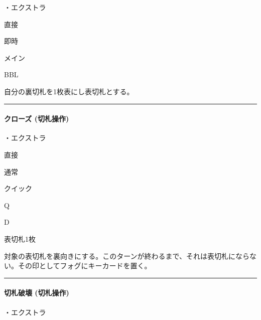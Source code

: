 \documentclass[letterpaper,10pt,dvipdfmx]{sphinxmanual}
\begin{document}
\sphinxAtStartPar
・エクストラ

\sphinxAtStartPar
{} 直接

\sphinxAtStartPar
{} 即時

\sphinxAtStartPar
{} メイン

\sphinxAtStartPar
{} BBL

\sphinxAtStartPar
{}

\sphinxAtStartPar
自分の裏切札を1枚表にし表切札とする。


\bigskip\hrule\bigskip



\paragraph{クローズ (切札操作)}
\label{\detokenize{auto/frameActionlist:act-close}}\label{\detokenize{auto/frameActionlist:id12}}
\sphinxAtStartPar
{}

\sphinxAtStartPar
・エクストラ

\sphinxAtStartPar
{} 直接

\sphinxAtStartPar
{} 通常

\sphinxAtStartPar
{} クイック

\sphinxAtStartPar
{} Q

\sphinxAtStartPar
{} D

\sphinxAtStartPar
{}

\sphinxAtStartPar
表切札1枚

\sphinxAtStartPar
{}

\sphinxAtStartPar
対象の表切札を裏向きにする。このターンが終わるまで、それは表切札にならない。その印としてフォグにキーカードを置く。


\bigskip\hrule\bigskip



\paragraph{切札破壊 (切札操作)}
\label{\detokenize{auto/frameActionlist:act-trumpdestroy}}\label{\detokenize{auto/frameActionlist:id13}}
\sphinxAtStartPar
{}

\sphinxAtStartPar
・エクストラ
\end{document}
